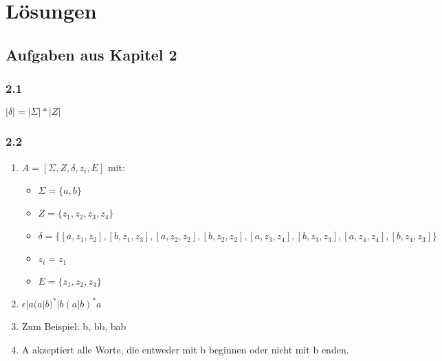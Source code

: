 \section{Lösungen}

\subsection*{Aufgaben aus Kapitel 2}
\subsubsection*{2.1}

$|\delta| = |\Sigma| * |Z|$\\


\subsubsection*{2.2}

\begin{enumerate}[label=(\alph*)]
    \item $A = [\Sigma, Z, \delta, z_i, E]$ mit:
        \begin{itemize}
            \item $\Sigma = \{a,b\}$
            \item $Z = \{z_1, z_2, z_3, z_4\}$
            \item $\delta = \{
                    [a, z_1, z_2], [b, z_1, z_3],
                    [a, z_2, z_2], [b, z_2, z_2],
                    [a, z_3, z_4], [b, z_3, z_3],
                    [a, z_4, z_4], [b, z_4, z_3]
                \}$
            \item $z_i = z_1$
            \item $E = \{z_1, z_2, z_4\}$
        \end{itemize}

    \item $\epsilon|a(a|b)^*|b(a|b)^*a$

    \item Zum Beispiel: b, bb, bab

    \item A akzeptiert alle Worte, die entweder mit b beginnen oder nicht mit b enden.
\end{enumerate}


